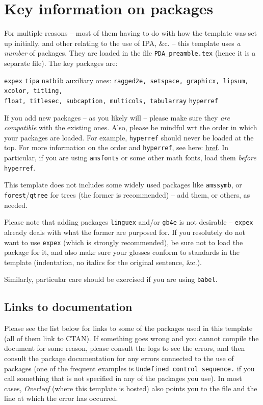 \documentclass[11pt, letterpaper]{article}
\begin{document}
\section{Key information on packages}
For multiple reasons -- most of them having to do with how the template was set up initially, and other relating to the use of IPA, \&c. -- this template uses \textit{a number} of packages. They are loaded in the file \verb=PDA_preamble.tex= (hence it is a separate file). The key packages are:

\pex
\a \verb=expex=
\a \verb=tipa=
\a \verb=natbib=
\a auxiliary ones: \verb=ragged2e, setspace, graphicx, lipsum, xcolor, titling,= \\ \verb=float, titlesec, subcaption, multicols, tabularray=
\a \verb=hyperref=
\xe

If you add new packages -- as you likely will -- please make sure they \textit{are compatible} with the existing ones. Also, please be mindful wrt the order in which your packages are loaded. For example, \verb=hyperref= should never be loaded at the top. For more information on the order and \verb=hyperref=, see here: \href{https://texblog.net/hyperref/}{href}. In particular, if you are using \verb=amsfonts= or some other math fonts, load them \textit{before} \verb=hyperref=.

This template does not includes some widely used packages like \verb=amssymb=, or \verb=forest=/\verb=qtree= for trees (the former is recommended) -- add them, or others, as needed.

Please note that adding packages \verb=linguex= and/or \verb=gb4e= is not desirable -- \verb=expex= already deals with what the former are purposed for. If you resolutely do not want to use \verb=expex= (which is strongly recommended), be sure not to load the package for it, and also make sure your glosses conform to standards in the template (indentation, no italics for the original sentence, \&c.).

Similarly, particular care should be exercised if you are using \verb=babel=.

\subsection{Links to documentation}
Please see the list below for links to some of the packages used in this template (all of them link to CTAN). If something goes wrong and you cannot compile the document for some reason, please consult the logs to see the errors, and then consult the package documentation for any errors connected to the use of packages (one of the frequent examples is \verb=Undefined control sequence.= if you call something that is not specified in any of the packages you use). In most cases, \textit{Overleaf} (where this template is hosted) also points you to the file and the line at which the error has occurred.
\end{document}
